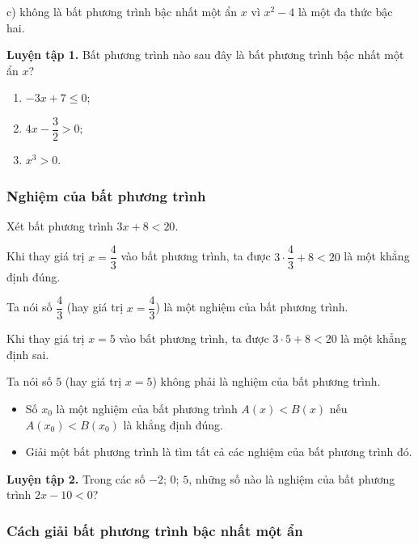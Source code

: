 \begin{lesson}
    c) không là bất phương trình bậc nhất một ẩn $x$ vì $x^2-4$ là một đa thức bậc hai.

    \textbf{Luyện tập 1.} Bất phương trình nào sau đây là bất phương trình bậc nhất một ẩn $x$?

    \begin{enumerate}[label=\alph*)]
        \item $-3x+7\leq 0$;
        \item $4x-\dfrac{3}{2}>0$;
        \item $x^3>0$.
    \end{enumerate}

    \answerline

    \subsubsection{Nghiệm của bất phương trình}

    Xét bất phương trình $3x+8<20$.

    Khi thay giá trị $x=\dfrac{4}{3}$ vào bất phương trình, ta được $3\cdot\dfrac{4}{3}+8<20$ là một khẳng định đúng.

    Ta nói số $\dfrac{4}{3}$ (hay giá trị $x=\dfrac{4}{3}$) là một nghiệm của bất phương trình.

    Khi thay giá trị $x=5$ vào bất phương trình, ta được $3\cdot 5+8<20$ là một khẳng định sai.

    Ta nói số $5$ (hay giá trị $x=5$) không phải là nghiệm của bất phương trình.

    \begin{keyconcept}
        \begin{itemize}
            \item Số $x_0$ là một nghiệm của bất phương trình $A(x)<B(x)$ nếu $A(x_0)<B(x_0)$ là khẳng định đúng.
            \item Giải một bất phương trình là tìm tất cả các nghiệm của bất phương trình đó.
        \end{itemize}
    \end{keyconcept}

    \textbf{Luyện tập 2.} Trong các số $-2$; $0$; $5$, những số nào là nghiệm của bất phương trình $2x-10<0$?

    \answerline

    \subsubsection{Cách giải bất phương trình bậc nhất một ẩn}


\end{lesson}
